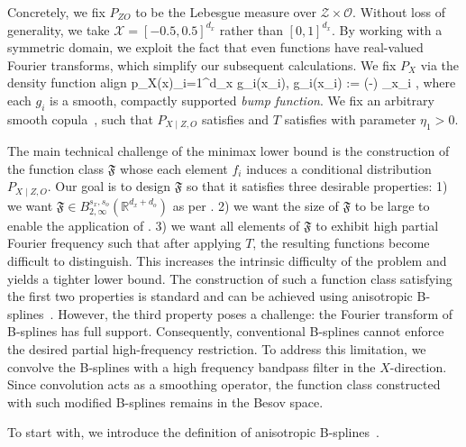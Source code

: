 \documentclass[11pt]{article}
\newenvironment{talign}
 {\let\displaystyle\textstyle\csname align\endcsname}
 {\endalign}
\newcommand{\one}{\mathbbm{1}}
\newcommand{\bx}{\mathbf x}
\newcommand{\calZ}{\mathcal{Z}}
\newcommand{\calO}{\mathcal{O}}
\newcommand{\calX}{\mathcal{X}}
\newcommand{\R}{\mathbb{R}}
\newcommand{\0}{\mathbf{0}}
\begin{document}
Concretely, we fix $P_{ZO}$ to be the Lebesgue measure over $\calZ\times \calO$. Without loss of generality, we take $\calX = [-0.5, 0.5]^{d_x}$ rather than $[0,1]^{d_x}$.  By working with a symmetric domain, we exploit the fact that even functions have real-valued Fourier transforms, which simplify our subsequent calculations. We fix $P_{X}$ via the density function
\begin{talign}\label{eq:p_X_bump_main}
    p_X(\bx)\propto \prod_{i=1}^{d_x} g_i(x_i), \quad g_i(x_i) := \exp\left(-\right) \one_{x_i \in [-0.5, 0.5]},
\end{talign}
where each $g_i$ is a smooth, compactly supported \emph{bump function}. We fix an arbitrary smooth copula~\citep{nelsen2006introduction}, such that $P_{X\mid Z,O}$ satisfies  and $T$ satisfies  with parameter $\eta_1>0$. 

The main technical challenge of the minimax lower bound is the construction of the function class $\mathfrak{F}$ whose each element $f_i$ induces a conditional distribution $P_{X\mid Z, O}$.
Our goal is to design $\mathfrak{F}$ so that it satisfies three desirable properties: 1) we want $\mathfrak{F}\in B_{2,\infty}^{s_x,s_o}(\R^{d_x+d_o})$ as per . 
2) we want the size of $\mathfrak{F}$ to be large to enable the application of \citet[Theorem 20]{fischer2020sobolev}. 
3) we want all elements of $\mathfrak{F}$ to exhibit high partial Fourier frequency such that after applying $T$, the resulting functions become difficult to distinguish. 
This increases the intrinsic difficulty of the problem and yields a tighter lower bound. 
The construction of such a function class satisfying the first two properties is standard and can be achieved using anisotropic B-splines~\citep{ibragimov1984asymptotic, suzuki2021deep,schmidt2020nonparametric}. 
However, the third property poses a challenge: the Fourier transform of B-splines has full support. 
Consequently, conventional B-splines cannot enforce the desired partial high-frequency restriction. To address this limitation, we convolve the B-splines with a high frequency bandpass filter in the $X$-direction. 
Since convolution acts as a smoothing operator, the function class constructed with such modified B-splines remains in the Besov space. 

To start with, we introduce the definition of anisotropic B-splines~\citep{leisner_nonlinear_wavelet_approximation_2003}. 
\end{document}
